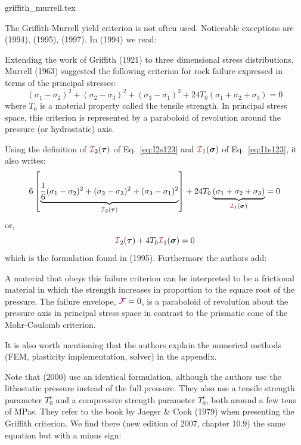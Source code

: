 \begin{flushright} {\tiny {\color{gray} griffith\_murrell.tex}} \end{flushright}

The Griffith-Murrell yield criterion is not often used.
Noticeable exceptions are \textcite{brau94} (1994), \textcite{brbe95} (1995), \textcite{babr97} (1997).
In \textcite{brau94} (1994) we read:
\begin{displayquote}
Extending the work of Griffith (1921) to three dimensional stress distributions, 
Murrell (1963) suggested the following criterion for rock failure expressed 
in terms of the principal stresses:
\[
(\sigma_1-\sigma_2)^2 + (\sigma_2-\sigma_3)^2 + (\sigma_3-\sigma_1)^2
+
24T_0 (\sigma_1+\sigma_2+\sigma_3)=0
\]
where $T_0$ is a material property called the tensile strength. In principal stress space, 
this criterion is represented by a paraboloid of revolution around the pressure (or hydrostatic) axis.
\end{displayquote}

\noindent Using the definition of ${\III}_2({\bm \tau})$ of Eq.~\eqref{eq:I2s123} and ${\III}_1({\bm \sigma})$ of 
Eq.~\eqref{eq:I1s123}, it also writes:
\[
6 \left[\underbrace{\frac16 (\sigma_1-\sigma_2)^2 + (\sigma_2-\sigma_3)^2 + (\sigma_3-\sigma_1)^2}_{\III_2(\bm \tau)} \right]
+
24 T_0 \underbrace{(\sigma_1+\sigma_2+\sigma_3)}_{\III_1(\bm\sigma)}=0
\]
or,
\[
{\III}_2({\bm \tau}) + 4 T_0 \III_1(\bm\sigma) =0
\]
which is the formulation found in \textcite{brbe95} (1995). Furthermore the authors add:
\begin{displayquote}
A material that obeys this failure criterion can
be interpreted to be a frictional material in which the
strength increases in proportion to the square root of the
pressure. The failure envelope, ${\color{violet}\cal F}=0$, is a paraboloid
of revolution about the pressure axis in principal stress space
in contrast to the prismatic cone of the Mohr-Coulomb criterion.
\end{displayquote}
It is also worth mentioning that the authors explain the numerical methods
(FEM, plasticity implementation, solver) in the appendix.

Note that \textcite{hanl00} (2000) use an identical formulation, although 
the authors use the lithostatic pressure instead of the full pressure. 
They also use a tensile 
strength parameter $T_0^e$ and a compressive strength parameter $T_0^c$, both around a few tens 
of MPas. They refer to the book by Jaeger \& Cook (1979) when presenting the Griffith criterion. 
We find there (new edition of 2007, chapter 10.9) the same equation 
but with a minus sign:

